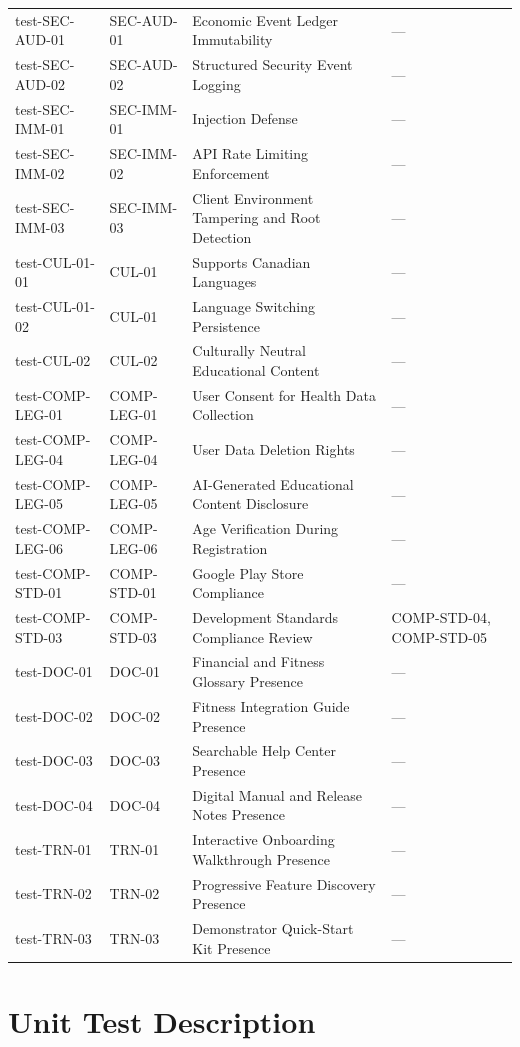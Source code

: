 \documentclass[12pt, titlepage]{article}
\begin{document}
\begin{xltabular}{\textwidth}{p{3cm}p{2.3cm}>{\raggedright\arraybackslash}X>{\raggedright\arraybackslash}p{2.4cm}}
  test-SEC-AUD-01 & SEC-AUD-01 & Economic Event Ledger Immutability & ---\\
  test-SEC-AUD-02 & SEC-AUD-02 & Structured Security Event Logging & ---\\
  test-SEC-IMM-01 & SEC-IMM-01 & Injection Defense & ---\\
  test-SEC-IMM-02 & SEC-IMM-02 & API Rate Limiting Enforcement & ---\\
  test-SEC-IMM-03 & SEC-IMM-03 & Client Environment Tampering and Root Detection & ---\\
  test-CUL-01-01 & CUL-01 & Supports Canadian Languages & ---\\
  test-CUL-01-02 & CUL-01 & Language Switching Persistence & ---\\
  test-CUL-02 & CUL-02 & Culturally Neutral Educational Content & ---\\
  test-COMP-LEG-01 & COMP-LEG-01 & User Consent for Health Data Collection & ---\\
  test-COMP-LEG-04 & COMP-LEG-04 & User Data Deletion Rights & ---\\
  test-COMP-LEG-05 & COMP-LEG-05 & AI-Generated Educational Content Disclosure & ---\\
  test-COMP-LEG-06 & COMP-LEG-06 & Age Verification During Registration & ---\\
  test-COMP-STD-01 & COMP-STD-01 & Google Play Store Compliance & ---\\
  test-COMP-STD-03 & COMP-STD-03 & Development Standards Compliance Review & COMP-STD-04, COMP-STD-05\\
  test-DOC-01 & DOC-01 & Financial and Fitness Glossary Presence & ---\\
  test-DOC-02 & DOC-02 & Fitness Integration Guide Presence & ---\\
  test-DOC-03 & DOC-03 & Searchable Help Center Presence & ---\\
  test-DOC-04 & DOC-04 & Digital Manual and Release Notes Presence & ---\\
  test-TRN-01 & TRN-01 & Interactive Onboarding Walkthrough Presence & ---\\
  test-TRN-02 & TRN-02 & Progressive Feature Discovery Presence & ---\\
  test-TRN-03 & TRN-03 & Demonstrator Quick-Start Kit Presence & ---\\
\end{xltabular}

\section{Unit Test Description}\label{sec:unit_tests}
\end{document}
